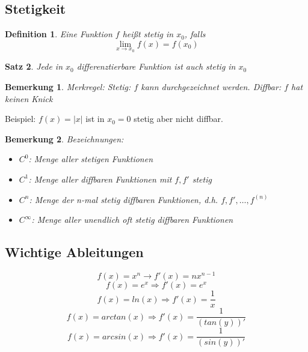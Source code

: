 \documentclass[12pt,a4paper]{article}%
\newtheorem{satz}{Satz}[section]
\newtheorem{definition}[satz]{Definition}
\newtheorem{bem}{Bemerkung}[section]
\numberwithin{equation}{section}
\numberwithin{equation}{subsection}
\begin{document}
  \subsection{Stetigkeit}
  \begin{definition}
    Eine Funktion $f$ heißt stetig in $x_0$, falls 
    \begin{equation}
      \lim_{x \rightarrow x_0} f(x) = f(x_0)
    \end{equation}
  \end{definition}
  \begin{satz}
    Jede in $x_0$ differenztierbare Funktion ist auch stetig in $x_0$  
  \end{satz}
  \begin{bem}
    Merkregel:\newline
    Stetig: $f$ kann durchgezeichnet werden.\newline
    Diffbar: $f$ hat keinen Knick
  \end{bem}
  Beispiel:\newline
  $f(x) = |x|$ ist in $x_0 = 0$ stetig aber nicht diffbar.
  \begin{bem}
    Bezeichnungen:
    \begin{itemize}
      \item $C^0$: Menge aller stetigen Funktionen
      \item $C^1$: Menge aller diffbaren Funktionen mit $f,f'$ stetig
      \item $C^n$: Menge der n-mal stetig diffbaren Funktionen, d.h. $f, f', \dots, f^{(n)}$
      \item $C^{\infty}$: Menge aller unendlich oft stetig diffbaren Funktionen
    \end{itemize}
  \end{bem}
  \subsection{Wichtige Ableitungen}
  \begin{equation}
    f(x) = x^n \rightarrow f'(x) = nx^{n-1}
  \end{equation}
  \begin{equation}
    f(x) = e^x \Rightarrow f'(x) = e^x
  \end{equation}
  \begin{equation}
    f(x) = ln(x) \Rightarrow f'(x) = \frac{1}{x}
  \end{equation}
  \begin{equation}
    f(x) = arctan(x) \Rightarrow f'(x) = \frac{1}{(tan(y))'}
  \end{equation}
  \begin{equation}
    f(x) = arcsin(x) \Rightarrow f'(x) = \frac{1}{(sin(y))'}
  \end{equation}
\end{document}
